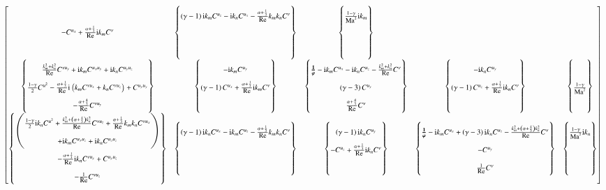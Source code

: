 \documentclass[letterpaper,11pt,nointlimits,reqno,draft]{amsart}
\newcommand{\ii}{\ensuremath{\mathrm{i}}}
\begin{document}
\begin{sidewaysfigure}
{{\begin{minipage}[c]{\textwidth}
\begin{align*}
\begin{bmatrix}
{  }{
    - \C{u_x}{}
    + \frac{\alpha+\frac{1}{3}}{\Re}\ii\km\C{\nu}{}
  }{
  }
& \entry{\mx\mz  }
  \subcoeff{
      \left(\g-1\right)\ii\km\C{u_z}{}
    - \ii\kn\C{u_x}{}
    - \frac{\alpha+\frac{1}{3}}{\Re}\km\kn\C{\nu}{}
  }{
  }{
  }
& \entry{\mx{}e  }
  \subcoeff{
      \frac{1-\g}{\Ma^2}\ii\km
  }{
  }{
  }
\\\entry{\my\rho }
  \subcoeff{
      \frac{\km^2+\kn^2}{\Re}\C{\nu{}u_y}{}
    + \ii\km\C{u_x u_y}{}
    + \ii\kn\C{u_y u_z}{}
  }{
      \frac{1-\g}{2}\C{u^2}{}
    - \frac{\alpha+\frac{1}{3}}{\Re}\ii\left(
         \km\C{\nu{}u_x}{} + \kn\C{\nu{}u_z}{}
      \right)
    + \C{u_y u_y}{}
  }{
    - \frac{\alpha+\frac{4}{3}}{\Re}\C{\nu{}u_y}{}
  }
& \entry{\my\mx  }
  \subcoeff{
    - \ii\km\C{u_y}{}
  }{
      \left(\g-1\right)\C{u_x}{}
    + \frac{\alpha+\frac{1}{3}}{\Re}\ii\km\C{\nu}{}
  }{
  }
& \entry{\my\my  }
  \subcoeff{
      \bm{\frac{1}{\vp}} %
    - \ii\km\C{u_x}{}
    - \ii\kn\C{u_z}{}
    - \frac{\km^2+\kn^2}{\Re}\C{\nu}{}
  }{
      \left(\g-3\right)\C{u_y}{}
  }{
      \frac{\alpha+\frac{4}{3}}{\Re}\C{\nu}{}
  }
& \entry{\my\mz  }
  \subcoeff{
    - \ii\kn\C{u_y}{}
  }{
      \left(\g-1\right)\C{u_z}{}
    + \frac{\alpha+\frac{1}{3}}{\Re}\ii\kn\C{\nu}{}
  }{
  }
& \entry{\my{}e  }
  \subcoeff{
  }{
      \frac{1-\g}{\Ma^2}
  }{
  }
\\\entry{\mz\rho}
  \subcoeff{
    \begin{pmatrix}
        \frac{1-\g}{2}\ii\kn\C{u^2}{}
      + \frac{\km^2+\left(\alpha+\frac{4}{3}\right)\kn^2}{\Re}\C{\nu{}u_z}{}
      + \frac{\alpha+\frac{1}{3}}{\Re}\km\kn\C{\nu{}u_x}{}
      \\
      + \ii\km\C{u_x u_z}{}
      + \ii\kn\C{u_z u_z}{}
    \end{pmatrix}
  }{
    - \frac{\alpha+\frac{1}{3}}{\Re}\ii\kn\C{\nu{}u_y}{}
    + \C{u_y u_z}{}
  }{
    - \frac{1}{\Re}\C{\nu{}u_z}{}
  }
& \entry{\mz\mx }
  \subcoeff{
      \left(\g-1\right)\ii\kn\C{u_x}{}
    - \ii\km\C{u_z}{}
    - \frac{\alpha+\frac{1}{3}}{\Re}\km\kn\C{\nu}{}
  }{
  }{
  }
& \entry{\mz\my }
  \subcoeff{
      \left(\g-1\right)\ii\kn\C{u_y}{}
  }{
    - \C{u_z}{}
    + \frac{\alpha+\frac{1}{3}}{\Re}\ii\kn\C{\nu}{}
  }{
  }
& \entry{\mz\mz }
  \subcoeff{
      \bm{\frac{1}{\vp}} %
    - \ii\km\C{u_x}{}
    + \left(\g-3\right)\ii\kn\C{u_z}{}
    - \frac{\km^2+\left(\alpha+\frac{4}{3}\right)\kn^2}{\Re}\C{\nu}{}
  }{
    - \C{u_y}{}
  }{
      \frac{1}{\Re}\C{\nu}{}
  }
& \entry{\mz{}e }
  \subcoeff{
      \frac{1-\g}{\Ma^2}\ii\kn
  }{
  }{
  }

\end{bmatrix}
\end{align*}
\end{minipage}}}
\end{sidewaysfigure}
\end{document}
